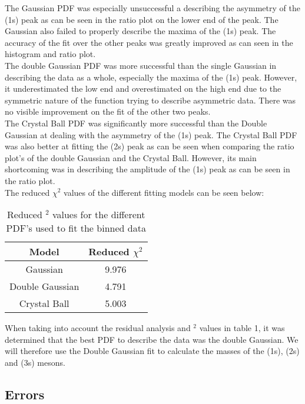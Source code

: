 The Gaussian PDF was especially unsuccessful a describing the asymmetry of the \textUpsilon(1s) peak as can be seen in the ratio plot on the lower end of the peak. The Gaussian also failed to properly describe the maxima of the \textUpsilon(1s) peak. The accuracy of the fit over the other peaks was greatly improved as can seen in the histogram and ratio plot.\\

The double Gaussian PDF was more successful than the single Gaussian in describing the data as a whole, especially the maxima of the \textUpsilon(1s) peak. However, it underestimated the low end and overestimated on the high end due to the symmetric nature of the function trying to describe asymmetric data. There was no visible improvement on the fit of the other two peaks.\\

The Crystal Ball PDF was significantly more successful than the Double Gaussian at dealing with the asymmetry of the \textUpsilon(1s) peak. The Crystal Ball PDF was also better at fitting the \textUpsilon(2s) peak as can be seen when comparing the ratio plot's of the double Gaussian and the Crystal Ball. However, its main shortcoming was in describing the amplitude of the \textUpsilon(1s) peak as can be seen in the ratio plot.\\

The reduced $\chi^2$ values of the different fitting models can be seen below:
\begin{table}[H]
\centering
\begin{tabular}{c|c}
Model           & Reduced $\chi^2$           \\ \hline
Gaussian        & 9.976 \\
Double Gaussian & 4.791 \\
Crystal Ball    & 5.003
\end{tabular}
\caption{Reduced \textchi$^2$ values for the different PDF's used to fit the binned data}
\label{tab:my-table}
\end{table}

When taking into account the residual analysis and \textchi$^2$ values in table 1, it was determined that the best PDF to describe the data was the double Gaussian. We will therefore use the Double Gaussian fit to calculate the masses of the \textUpsilon(1s), \textUpsilon(2s) and \textUpsilon(3s) mesons.

\subsection*{Errors}

